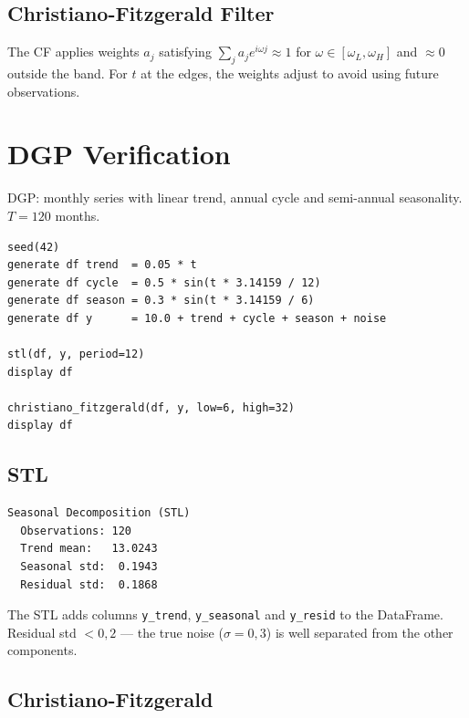 \subsection*{Christiano-Fitzgerald Filter}

The CF applies weights $a_j$ satisfying $\sum_j a_j e^{i\omega j} \approx 1$
for $\omega \in [\omega_L, \omega_H]$ and $\approx 0$ outside the band.
For $t$ at the edges, the weights adjust to avoid using future observations.

\section{DGP Verification}

DGP: monthly series with linear trend, annual cycle and semi-annual seasonality.
$T = 120$ months.

\begin{lstlisting}[caption={STL and Christiano-Fitzgerald}]
seed(42)
generate df trend  = 0.05 * t
generate df cycle  = 0.5 * sin(t * 3.14159 / 12)
generate df season = 0.3 * sin(t * 3.14159 / 6)
generate df y      = 10.0 + trend + cycle + season + noise

stl(df, y, period=12)
display df

christiano_fitzgerald(df, y, low=6, high=32)
display df
\end{lstlisting}

\subsection*{STL}

\begin{lstlisting}[language={}, basicstyle=\ttfamily\small, frame=none,
  numbers=none, backgroundcolor=\color{codbg}]
Seasonal Decomposition (STL)
  Observations: 120
  Trend mean:   13.0243
  Seasonal std:  0.1943
  Residual std:  0.1868
\end{lstlisting}

The STL adds columns \texttt{y\_trend}, \texttt{y\_seasonal} and \texttt{y\_resid}
to the DataFrame. Residual std $< 0{,}2$ — the true noise ($\sigma = 0{,}3$) is
well separated from the other components.

\subsection*{Christiano-Fitzgerald}

